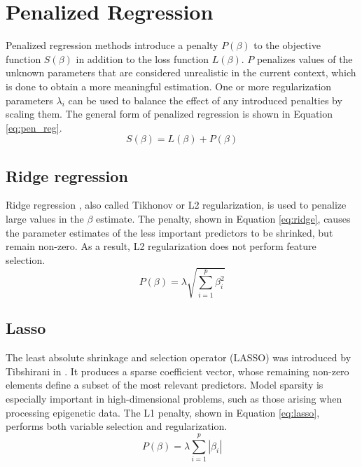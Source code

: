 \section{Penalized Regression}
Penalized regression methods introduce a penalty $P(\beta)$ to the objective function $S(\beta)$ in addition to the loss function $L(\beta)$. $P$ penalizes values of the unknown parameters that are considered unrealistic in the current context, which is done to obtain a more meaningful estimation. One or more regularization parameters $\lambda_i$ can be used to balance the effect of any introduced penalties by scaling them. The general form of penalized regression is shown in Equation \ref{eq:pen_reg}. 
\begin{equation} \label{eq:pen_reg}
S(\beta) = L(\beta) + P(\beta)
\end{equation}


\subsection{Ridge regression}
Ridge regression \cite{hoerl1970ridge}, also called Tikhonov or L2 regularization, is used to penalize large values in the $\beta$ estimate. The penalty, shown in Equation \ref{eq:ridge}, causes the parameter estimates of the less important predictors to be shrinked, but remain non-zero. As a result, L2 regularization does not perform feature selection.
\begin{equation} \label{eq:ridge}
P(\beta) = \lambda\sqrt{\sum_{i=1}^{p}\beta_i^2}
\end{equation}


\subsection{Lasso}
The least absolute shrinkage and selection operator (LASSO) was introduced by Tibshirani in \cite{tibshirani1996regression}. It produces a sparse coefficient vector, whose remaining non-zero elements define a subset of the most relevant predictors. Model sparsity is especially important in high-dimensional problems, such as those arising when processing epigenetic data. The L1 penalty, shown in Equation \ref{eq:lasso}, performs both variable selection and regularization.
\begin{equation} \label{eq:lasso}
P(\beta) = \lambda\sum_{i=1}^{p}\left|\beta_i\right|
\end{equation}



